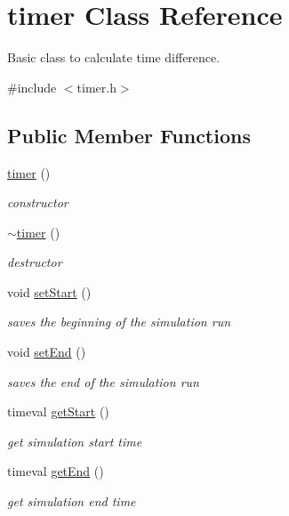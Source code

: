 \hypertarget{classtimer}{
\section{timer Class Reference}
\label{classtimer}
}


Basic class to calculate time difference.  




{\ttfamily \#include $<$timer.h$>$}

\subsection*{Public Member Functions}
\begin{DoxyCompactItemize}
\item 
\hyperlink{classtimer_ae536faf93e02933cd025a6fbcbb48d0a}{timer} ()
\begin{DoxyCompactList}\small\item\em constructor \item\end{DoxyCompactList}\item 
\hyperlink{classtimer_aee05958ea6b0fbf36ea1fd22747cd546}{$\sim$timer} ()
\begin{DoxyCompactList}\small\item\em destructor \item\end{DoxyCompactList}\item 
void \hyperlink{classtimer_ac5b8fb9779cf72c599d3360a75bc5b89}{setStart} ()
\begin{DoxyCompactList}\small\item\em saves the beginning of the simulation run \item\end{DoxyCompactList}\item 
void \hyperlink{classtimer_ae666e8e84f8ccccd1280518bc7c3f9c0}{setEnd} ()
\begin{DoxyCompactList}\small\item\em saves the end of the simulation run \item\end{DoxyCompactList}\item 
timeval \hyperlink{classtimer_aad52287ca6d6a3a285e171a592a85847}{getStart} ()
\begin{DoxyCompactList}\small\item\em get simulation start time \item\end{DoxyCompactList}\item 
timeval \hyperlink{classtimer_aa415a63f52ee3efb36bbeb9d18a813b8}{getEnd} ()
\begin{DoxyCompactList}\small\item\em get simulation end time \item\end{DoxyCompactList}\end{DoxyCompactItemize}


